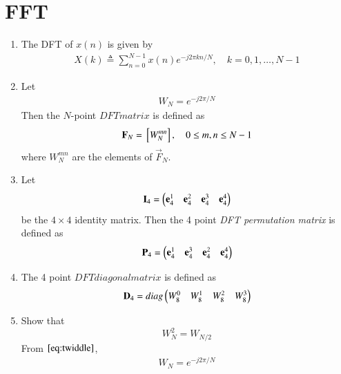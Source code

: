 \documentclass[journal,12pt,twocolumn]{IEEEtran}
\renewcommand\thesection{\arabic{section}}
\begin{document}
\section{FFT}
\begin{enumerate}[label=\arabic*.,ref=\thesection.\theenumi]
	\item The DFT of $x(n)$ is given by
	\begin{align}
		X(k) \triangleq \sum_{n=0}^{N-1} x(n) e^{-j 2 \pi k n / N}, \quad k=0,1, \ldots, N-1
	\end{align}
	\item Let 
	\begin{align}
		W_{N} = e^{-j2\pi/N} \label{eq:twiddle}
	\end{align}
	Then the $N$-point ${ DFT matrix}$ is defined as 
	\begin{align}
		\mathbf{F}_{N} = {}\left[W_{N}^{mn}\right], \quad 0 \le m,n \le N-1 \label{def:N-point_matrix} 
	\end{align}
	where $W_{N}^{mn}$ are the elements of $\vec{F}_{N}$.
	\item Let 
	\begin{align}
		\mathbf{I}_4 = \begin{pmatrix}\mathbf{e}_4^{1} &\mathbf{e}_4^{2} &\mathbf{e}_4^{3} &\mathbf{e}_4^{4} \end{pmatrix}
	\end{align}
	be the $4\times 4$ identity matrix.  Then the 4 point {\em DFT permutation matrix} is defined as 
	\begin{align}
		\mathbf{P}_4 = \begin{pmatrix}\mathbf{e}_4^{1} &\mathbf{e}_4^{3} &\mathbf{e}_4^{2} &\mathbf{e}_4^{4} \end{pmatrix} \label{elem_mat}
	\end{align}
	\item The 4 point ${ DFT diagonal matrix}$ is defined as 
	\begin{align}
		\mathbf{D}_4 = diag\begin{pmatrix}W_{8}^{0} & W_{8}^{1} & W_{8}^{2} & W_{8}^{3}\end{pmatrix}
	\end{align}
	\item Show that 
	\begin{equation}
		W_{N}^{2}=W_{N/2} \label{fft-3}
	\end{equation}
	\solution 
	From $\eqref{eq:twiddle}$,
	\begin{align}
		W_{N} = e^{-j2\pi/N}
	\end{align}

\end{enumerate}
\end{document}

